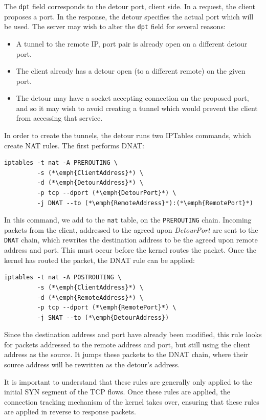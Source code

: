 \documentclass{cwru}
\begin{document}
The \texttt{dpt} field corresponds to the detour port, client side. In a
request, the client proposes a port. In the response, the detour specifies the
actual port which will be used. The server may wish to alter the \texttt{dpt}
field for several reasons:
\begin{itemize}
\item A tunnel to the remote IP, port pair is already open on a different detour
  port.
\item The client already has a detour open (to a different remote) on the given
  port.
\item The detour may have a socket accepting connection on the proposed port,
  and so it may wish to avoid creating a tunnel which would prevent the client
  from accessing that service.
\end{itemize}

In order to create the tunnels, the detour runs two IPTables commands, which
create NAT rules. The first performs DNAT:

\begin{lstlisting}
iptables -t nat -A PREROUTING \
         -s (*\emph{ClientAddress}*) \
         -d (*\emph{DetourAddress}*) \
         -p tcp --dport (*\emph{DetourPort}*) \
         -j DNAT --to (*\emph{RemoteAddress}*):(*\emph{RemotePort}*)
\end{lstlisting}

In this command, we add to the \texttt{nat} table, on the \texttt{PREROUTING}
chain. Incoming packets from the client, addressed to the agreed upon
\textit{DetourPort} are sent to the \texttt{DNAT} chain, which rewrites the
destination address to be the agreed upon remote address and port. This must
occur before the kernel routes the packet. Once the kernel has routed the
packet, the DNAT rule can be applied:

\begin{lstlisting}
iptables -t nat -A POSTROUTING \
         -s (*\emph{ClientAddress}*) \
         -d (*\emph{RemoteAddress}*) \
         -p tcp --dport (*\emph{RemotePort}*) \
         -j SNAT --to (*\emph{DetourAddress})
\end{lstlisting}

Since the destination address and port have already been modified, this rule
looks for packets addressed to the remote address and port, but still using the
client address as the source. It jumps these packets to the DNAT chain, where
their source address will be rewritten as the detour's address.

It is important to understand that these rules are generally only applied to the
initial SYN segment of the TCP flows. Once these rules are applied, the
connection tracking mechanism of the kernel takes over, ensuring that these
rules are applied in reverse to response packets.
\end{document}
